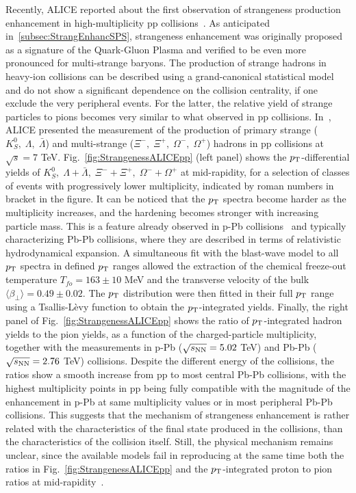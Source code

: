 Recently, ALICE reported about the first observation of strangeness production enhancement in high-multiplicity pp collisions~\cite{ALICE:2017jyt}. As anticipated in~\ref{subsec:StrangEnhancSPS}, strangeness enhancement was originally proposed as a signature of the Quark-Gluon Plasma and verified to be even more pronounced for multi-strange baryons. The production of strange hadrons in heavy-ion collisions can be described using a grand-canonical statistical model and do not show a significant dependence on the collision centrality, if one exclude the very peripheral events. For the latter, the relative yield of strange particles to pions becomes very similar to what observed in pp collisions. In~\cite{ALICE:2017jyt}, ALICE presented the measurement of the production of primary strange ($K^0_S,\; \Lambda,\; \bar{\Lambda}$) and multi-strange ($\Xi^-,\; \Xi^+,\; \Omega^-,\; \Omega^+$) hadrons in pp collisions at $\sqrt{s} = 7$ TeV. Fig.~\ref{fig:StrangenessALICEpp} (left panel) shows the $p_{\rm T}$-differential yields of $K^0_S,\; \Lambda + \bar{\Lambda},\; \Xi^- + \Xi^+,\; \Omega^- + \Omega^+$ at mid-rapidity, for a selection of classes of events with progressively lower multiplicity, indicated by roman numbers in bracket in the figure. It can be noticed that the $p_{\rm T}$ spectra become harder as the multiplicity increases, and the hardening becomes stronger with increasing particle mass. This is a feature already observed in p-Pb collisions~\cite{Abelev:2013haa} and typically characterizing Pb-Pb collisions, where they are described in terms of relativistic hydrodynamical expansion. A simultaneous fit with the blast-wave model to all $p_{\rm T}$ spectra in defined $p_{\rm T}$ ranges allowed the extraction of the chemical freeze-out temperature $T_{fo} = 163 \pm 10$ MeV and the transverse velocity of the bulk $\langle \beta_{\perp} \rangle = 0.49 \pm 0.02$. The $p_{\rm T}$ distribution were then fitted in their full $p_{\rm T}$ range using a Tsallis-Lèvy function to obtain the $p_{\rm T}$-integrated yields. Finally, the right panel of Fig.~\ref{fig:StrangenessALICEpp} shows the ratio of $p_{\rm T}$-integrated hadron yields to the pion yields, as a function of the charged-particle multiplicity, together with the measurements in p-Pb ($\sqrt{s_{\rm NN}} = 5.02$ TeV) and Pb-Pb ($\sqrt{s_{\rm NN}} = 2.76$ TeV) collisions. Despite the different energy of the collisions, the ratios show a smooth increase from pp to most central Pb-Pb collisions, with the highest multiplicity points in pp being fully compatible with the magnitude of the enhancement in p-Pb at same multiplicity values or in most peripheral Pb-Pb collisions. This suggests that the mechanism of strangeness enhancement is rather related with the characteristics of the final state produced in the collisions, than the characteristics of the collision itself. Still, the physical mechanism remains unclear, since the available models fail in reproducing at the same time both the ratios in Fig.~\ref{fig:StrangenessALICEpp} and the $p_{\rm T}$-integrated proton to pion ratios at mid-rapidity~\cite{ALICE:2017jyt}.
